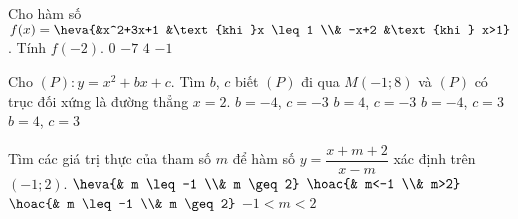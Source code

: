 \begin{ex}%
	Cho hàm số $f(x)=\heva{&x^2+3x+1 &\text{khi }x \leq 1 \\& -x+2 &\text{khi } x>1}$. Tính $f(-2)$.
	\choice
	{$0$}
	{$-7$}
	{$4$}
	{\True $-1$}
\end{ex}
\begin{ex}%
	Cho $(P)\colon y=x^2+bx+c$. Tìm $b$, $c$ biết $(P)$ đi qua $M(-1;8)$ và $(P)$ có trục đối xứng là đường thẳng $x=2$.
	\choice
	{$b=-4$, $c=-3$}
	{$b=4$, $c=-3$}
	{\True $b=-4$, $c=3$}
	{$b=4$, $c=3$}
\end{ex}
\begin{ex}%
	Tìm các giá trị thực của tham số $m$ để hàm số $y=\dfrac{x+m+2}{x-m}$ xác định trên $(-1;2)$.
	\choice
	{$\heva{& m \leq-1 \\& m \geq 2}$}
	{$\hoac{& m<-1 \\& m>2}$}
	{\True $\hoac{& m \leq-1 \\& m \geq 2}$}
	{$-1<m<2$}
\end{ex}
